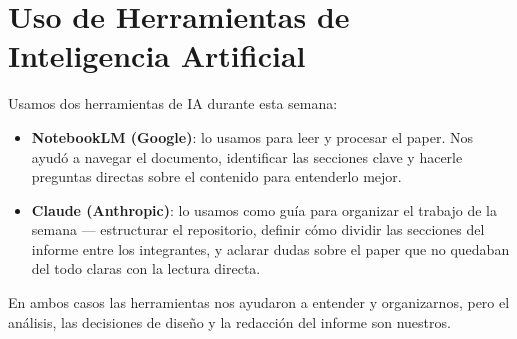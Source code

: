 
\section{Uso de Herramientas de Inteligencia Artificial}

Usamos dos herramientas de IA durante esta semana:

\begin{itemize}
    \item \textbf{NotebookLM (Google)}: lo usamos para leer y procesar el paper.
          Nos ayudó a navegar el documento, identificar las secciones clave y
          hacerle preguntas directas sobre el contenido para entenderlo mejor.

    \item \textbf{Claude (Anthropic)}: lo usamos como guía para organizar el
          trabajo de la semana — estructurar el repositorio, definir cómo dividir
          las secciones del informe entre los integrantes, y aclarar dudas sobre
          el paper que no quedaban del todo claras con la lectura directa.
\end{itemize}

En ambos casos las herramientas nos ayudaron a entender y organizarnos, pero
el análisis, las decisiones de diseño y la redacción del informe son nuestros.
